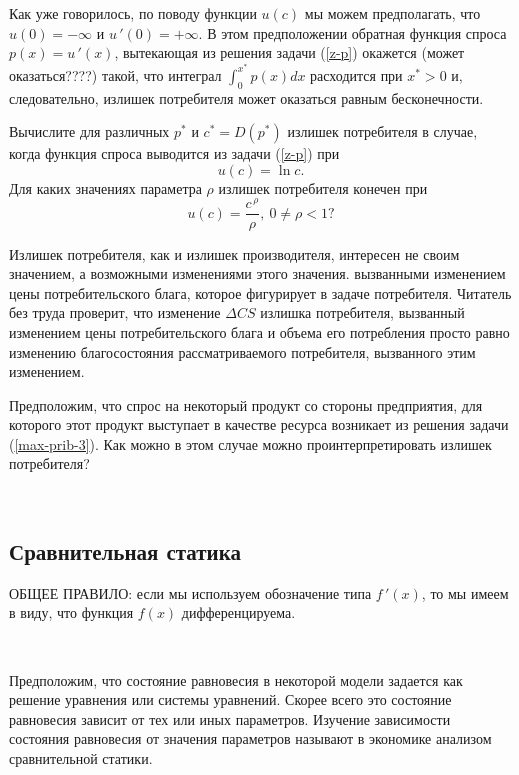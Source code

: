     Как уже говорилось, по поводу функции $u(c)$ мы можем
    предполагать, что $u(0)=-\infty$ и $u\,'(0)=+\infty$. В этом
    предположении обратная функция спроса $p(x)=u\,'(x)$, вытекающая из решения задачи
    (\ref{z-p}) окажется (может оказаться????) такой, что интеграл
    $\int_{0}^{x^{*}}p(x)dx$ расходится при $x^{*}>0$ и, следовательно,
    излишек потребителя может оказаться равным бесконечности.
\begin{exer}
    Вычислите для различных $p^{*}$ и $c^{*}=D(p^{*})$ излишек
    потребителя в случае, когда функция спроса
    выводится из задачи (\ref{z-p}) при
    \[u(c)=\ln c .\]
    Для каких значениях параметра $\rho$ излишек потребителя конечен при
    \[u(c)=\frac{c^{\,\rho}}{\rho}, \ 0\neq\rho<1?\]
\end{exer}

    Излишек потребителя, как и излишек  производителя, интересен не
    своим значением, а возможными изменениями этого значения.
    вызванными изменением цены потребительского блага, которое
    фигурирует в задаче потребителя. Читатель без труда проверит,
    что изменение $\Delta CS$ излишка потребителя, вызванный
    изменением цены потребительского блага и объема его потребления
    просто равно изменению благосостояния
    рассматриваемого потребителя, вызванного этим изменением.

\begin{exer}
    Предположим, что спрос на некоторый продукт со стороны
    предприятия, для которого этот продукт выступает в качестве ресурса
    возникает из решения задачи (\ref{max-prib-3}). Как можно в этом
    случае можно проинтерпретировать излишек потребителя?
\end{exer}


\





\subsection{Сравнительная статика}

    ОБЩЕЕ ПРАВИЛО: если мы используем обозначение типа $f\,'(x)$, то
    мы имеем в виду, что функция $f(x)$ дифференцируема.

    \

    Предположим, что состояние равновесия в некоторой модели задается
    как решение уравнения или системы уравнений. Скорее всего это состояние
    равновесия зависит от тех или иных параметров. Изучение зависимости
    состояния равновесия от значения параметров называют в экономике
    анализом сравнительной статики.

